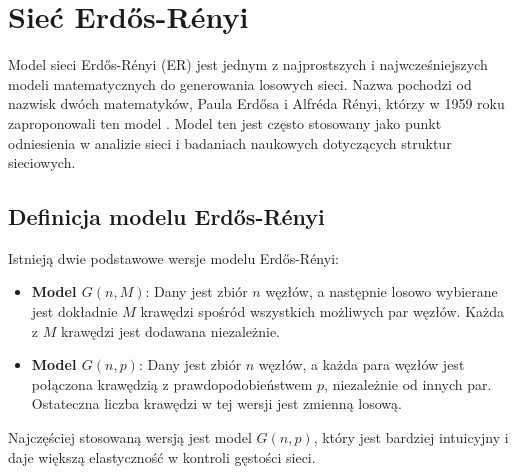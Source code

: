 \section{Sieć Erdős-Rényi}
Model sieci Erdős-Rényi (ER) jest jednym z najprostszych i najwcześniejszych modeli matematycznych do generowania losowych sieci.
Nazwa pochodzi od nazwisk dwóch matematyków, Paula Erdősa i Alfréda Rényi, którzy w 1959 roku zaproponowali ten model \cite{Erdos1959}.
Model ten jest często stosowany jako punkt odniesienia w analizie sieci i badaniach naukowych dotyczących struktur sieciowych.

\subsection{Definicja modelu Erdős-Rényi}
Istnieją dwie podstawowe wersje modelu Erdős-Rényi:

\begin{itemize}
      \item \textbf{Model $G(n, M)$}: Dany jest zbiór $n$ węzłów, a następnie losowo wybierane jest dokładnie $M$ krawędzi spośród wszystkich możliwych par węzłów.
            Każda z $M$ krawędzi jest dodawana niezależnie.
      \item \textbf{Model $G(n, p)$}: Dany jest zbiór $n$ węzłów, a każda para węzłów jest połączona krawędzią z prawdopodobieństwem $p$, niezależnie od innych par.
            Ostateczna liczba krawędzi w tej wersji jest zmienną losową.
\end{itemize}

Najczęściej stosowaną wersją jest model $G(n, p)$, który jest bardziej intuicyjny i daje większą elastyczność w kontroli gęstości sieci.

